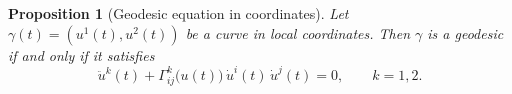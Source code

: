 \documentclass[12pt,a4paper]{article}
\theoremstyle{plain}
\newtheorem{proposition}[theorem]{Proposition}
\theoremstyle{definition}      %
\begin{document}
	\begin{proposition}[Geodesic equation in coordinates]
		Let $\gamma(t)=(u^1(t),u^2(t))$ be a curve in local coordinates.
		Then $\gamma$ is a geodesic if and only if it satisfies
		\[
		\ddot u^k(t) + \Gamma^k_{ij}\bigl(u(t)\bigr)\,\dot u^i(t)\,\dot u^j(t)
		= 0,\qquad k=1,2.
		\]
	\end{proposition}
	
	
	
\end{document}
